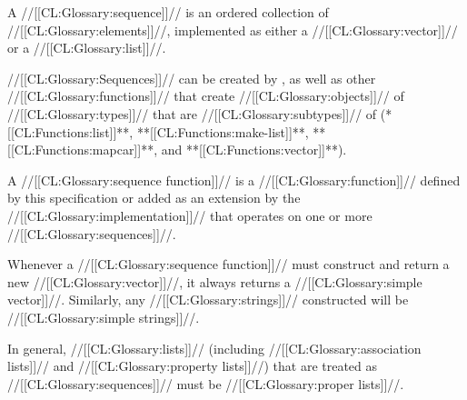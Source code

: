 

A //[[CL:Glossary:sequence]]// is an ordered collection of //[[CL:Glossary:elements]]//, implemented as either a //[[CL:Glossary:vector]]// or a //[[CL:Glossary:list]]//.

//[[CL:Glossary:Sequences]]// can be created by , as well as other //[[CL:Glossary:functions]]// that create //[[CL:Glossary:objects]]//  of //[[CL:Glossary:types]]// that are //[[CL:Glossary:subtypes]]// of   (\eg **[[CL:Functions:list]]**, **[[CL:Functions:make-list]]**, **[[CL:Functions:mapcar]]**, and **[[CL:Functions:vector]]**).

A //[[CL:Glossary:sequence function]]// is a //[[CL:Glossary:function]]// 
   defined by this specification or added as an extension by the //[[CL:Glossary:implementation]]//  that operates on one or more //[[CL:Glossary:sequences]]//.

Whenever a //[[CL:Glossary:sequence function]]// must construct and return a new //[[CL:Glossary:vector]]//, it always returns a //[[CL:Glossary:simple vector]]//. Similarly, any //[[CL:Glossary:strings]]// constructed will be //[[CL:Glossary:simple strings]]//.

 


In general, //[[CL:Glossary:lists]]// (including //[[CL:Glossary:association lists]]// and //[[CL:Glossary:property lists]]//) that are treated as //[[CL:Glossary:sequences]]// must be //[[CL:Glossary:proper lists]]//.

\endsubsection%

